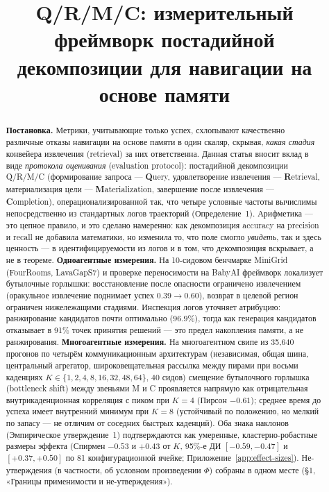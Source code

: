 \documentclass{article}
\title{Q/R/M/C: измерительный фреймворк постадийной декомпозиции для навигации на основе памяти}
\begin{document}
\maketitle

\begin{abstract}
\textbf{Постановка.} Метрики, учитывающие только успех, схлопывают качественно различные отказы навигации на основе памяти в один скаляр, скрывая, \emph{какая стадия} конвейера извлечения (retrieval) за них ответственна. Данная статья вносит вклад в виде \emph{протокола оценивания} (evaluation protocol): постадийной декомпозиции Q/R/M/C (формирование запроса --- \textbf{Q}uery, удовлетворение извлечения --- \textbf{R}etrieval, материализация цели --- \textbf{M}aterialization, завершение после извлечения --- \textbf{C}ompletion), операционализированной так, что четыре условные частоты вычислимы непосредственно из стандартных логов траекторий (Определение~1). Арифметика --- это цепное правило, и это сделано намеренно: как декомпозиция accuracy на precision и recall не добавила математики, но изменила то, что поле смогло \emph{увидеть}, так и здесь ценность --- в идентифицируемости из логов и в том, что декомпозиция вскрывает, а не в теореме.
\textbf{Одноагентные измерения.} На 10-сидовом бенчмарке MiniGrid (FourRooms, LavaGapS7) и проверке переносимости на BabyAI фреймворк локализует бутылочные горлышки: восстановление после опасности ограничено извлечением (оракульное извлечение поднимает успех $0.39\to0.60$), возврат в целевой регион ограничен нижележащими стадиями. Инспекция логов уточняет атрибуцию: ранжирование кандидатов почти оптимально ($96.9\%$), тогда как генерация кандидатов отказывает в 91\% точек принятия решений --- это предел накопления памяти, а не ранжирования.
\textbf{Многоагентные измерения.} На многоагентном свипе из 35{,}640 прогонов по четырём коммуникационным архитектурам (независимая, общая шина, центральный агрегатор, широковещательная рассылка между пирами при восьми каденциях $K{\in}\{1,2,4,8,16,32,48,64\}$, 40 сидов) смещение бутылочного горлышка (bottleneck shift) между звеньями M и C проявляется напрямую как отрицательная внутрикаденционная корреляция с пиком при $K{=}4$ (Пирсон $-0.61$); среднее время до успеха имеет внутренний минимум при $K{=}8$ (устойчивый по положению, но мелкий по запасу --- не отличим от соседних быстрых каденций). Оба знака наклонов (Эмпирическое утверждение~1) подтверждаются как умеренные, кластерно-робастные размеры эффекта (Спирмен $-0.53$ и $+0.43$ от $K$, 95\%-е ДИ $[-0.59,-0.47]$ и $[+0.37,+0.50]$ по 81 конфигурационной ячейке; Приложение~\ref{app:effect-sizes}). Не-утверждения (в частности, об условном произведении $\Phi$) собраны в одном месте (\S1, «Границы применимости и не-утверждения»).

\end{abstract}
\end{document}

